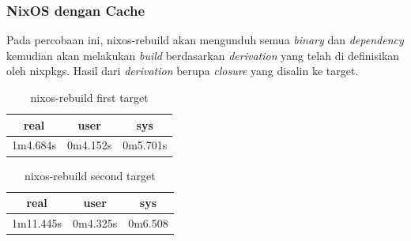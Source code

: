 \documentclass[10pt,]{report}
\begin{document}
\begin{adjustwidth}{20pt}{}
	\subsubsection{NixOS dengan Cache}
	\begin{adjustwidth}{20pt}{}
		Pada percobaan ini, nixos-rebuild akan mengunduh semua \textit{binary} dan
		\textit{dependency} kemudian akan melakukan \textit{build} berdasarkan
		\textit{derivation} yang telah di definisikan oleh nixpkgs. Hasil dari
		\textit{derivation} berupa \textit{closure} yang disalin ke target.
		\vspace{-3mm}
		\begin{table}[H]
			\begin{center}
				\begin{tabular}[c]{|c|c|c|}
					\hline
					\multicolumn{1}{|c|}{\textbf{real}} &
					\multicolumn{1}{c|}{\textbf{user}}  &
					\multicolumn{1}{c|}{\textbf{sys}}                         \\
					\hline
					1m4.684s                            & 0m4.152s & 0m5.701s \\

					\hline
				\end{tabular}
			\end{center}
			\caption{nixos-rebuild first target}
		\end{table}
		\vspace{-3mm}
		\begin{table}[H]
			\begin{center}
				\begin{tabular}[c]{|c|c|c|}
					\hline
					\multicolumn{1}{|c|}{\textbf{real}} &
					\multicolumn{1}{c|}{\textbf{user}}  &
					\multicolumn{1}{c|}{\textbf{sys}}                        \\
					\hline
					1m11.445s                           & 0m4.325s & 0m6.508 \\
					\hline
				\end{tabular}
			\end{center}
			\caption{nixos-rebuild second target}
		\end{table}
	\end{adjustwidth}

\end{adjustwidth}
\end{document}
